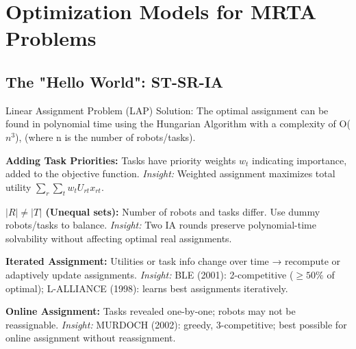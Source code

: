 \section*{Optimization Models for MRTA Problems}

\subsection*{The "Hello World": ST-SR-IA}
Linear Assignment Problem (LAP) Solution: The optimal assignment can be found in polynomial time using the Hungarian Algorithm with a complexity of O($n^3$), (where n is the number of robots/tasks).

\begin{tightitemize}
  \item \textbf{Adding Task Priorities:}  
        Tasks have priority weights $w_t$ indicating importance, added to the objective function.  
        \emph{Insight:} Weighted assignment maximizes total utility $\sum_r \sum_t w_t U_{rt} x_{rt}$.

  \item \textbf{$|R| \neq |T|$ (Unequal sets):}  
        Number of robots and tasks differ. Use dummy robots/tasks to balance.  
        \emph{Insight:} Two IA rounds preserve polynomial-time solvability without affecting optimal real assignments.

  \item \textbf{Iterated Assignment:}  
        Utilities or task info change over time → recompute or adaptively update assignments.  
        \emph{Insight:} BLE (2001): 2-competitive ($\ge 50\%$ of optimal); L-ALLIANCE (1998): learns best assignments iteratively.

  \item \textbf{Online Assignment:}  
        Tasks revealed one-by-one; robots may not be reassignable.  
        \emph{Insight:} MURDOCH (2002): greedy, 3-competitive; best possible for online assignment without reassignment.
\end{tightitemize}

